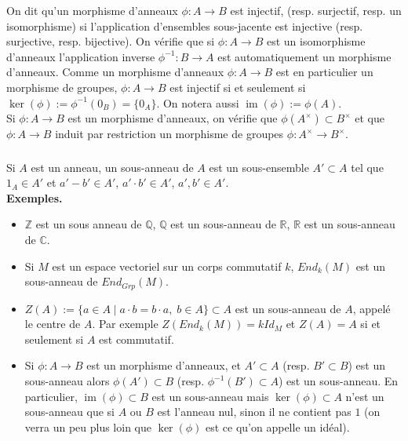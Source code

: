 \documentclass[a4paper, 12pt]{amsart}
\DeclareMathOperator{\im}{im}
\newcommand{\Q}{\mathbb{Q}}
\newcommand{\C}{\mathbb{C}}
\newcommand{\Z}{\mathbb{Z}}
\newcommand{\R}{\mathbb{R}}
\begin{document}
 On dit qu'un morphisme d'anneaux $\phi:A\rightarrow B$ est injectif, (resp. surjectif, resp. un isomorphisme) si l'application d'ensembles sous-jacente est injective (resp. surjective, resp. bijective). On vérifie que si $\phi:A\rightarrow B$ est un isomorphisme d'anneaux l'application inverse $\phi^{-1}:B\rightarrow A$ est automatiquement un morphisme d'anneaux. Comme un morphisme d'anneaux $\phi:A\rightarrow B$ est en particulier un morphisme de groupes, $\phi:A\rightarrow B$ est injectif si et seulement si $\ker(\phi):=\phi^{-1}(0_B)=\lbrace 0_A\rbrace$. On notera aussi $\im(\phi):=\phi(A)$. \\

 Si $\phi:A\rightarrow B$ est un morphisme d'anneaux, on vérifie que $\phi(A^\times)\subset B^\times$ et que $\phi:A\rightarrow B$ induit par restriction un morphisme de groupes $\phi:A^\times\rightarrow B^\times$.

\subsubsection{}Si $A$ est un anneau, un sous-anneau de $A$ est un sous-ensemble $A'\subset A$ tel que $1_A\in A'$ et $a'-b'\in A'$, $a'\cdot b'\in A'$, $a',b'\in A'$. \\

\textbf{Exemples.}
\begin{itemize}[leftmargin=* ,parsep=0cm,itemsep=0cm,topsep=0cm]
\item $\Z$ est un sous anneau de $\Q$, $\Q$ est un sous-anneau de $\R$, $\R$ est un sous-anneau de $\C$. 
\item Si $M$ est un espace vectoriel sur un corps commutatif $k$, $End_k(M)$ est un sous-anneau de $End_{Grp}(M)$. 
\item $Z(A):=\lbrace a\in A\;|\; a\cdot b=b\cdot a,\; b\in A\rbrace\subset A$ est un sous-anneau de $A$, appelé le centre de $A$. Par exemple $Z(End_k(M))=kId_M$ et $Z(A)=A$ si et seulement si $A$ est commutatif. 
\item Si $\phi:A\rightarrow B$ est un morphisme d'anneaux, et $A'\subset A$ (resp. $B'\subset B$) est un sous-anneau alors $\phi(A')\subset B$ (resp. $\phi^{-1}(B')\subset A$) est un sous-anneau. En particulier, $\im(\phi)\subset B$ est un sous-anneau mais  $\ker(\phi)\subset A$ n'est un sous-anneau que si $A$ ou $B$ est l'anneau nul, sinon il ne contient pas $1$ (on verra un peu plus loin que $\ker(\phi)$ est ce qu'on appelle un idéal).
\end{itemize}
\end{document}
